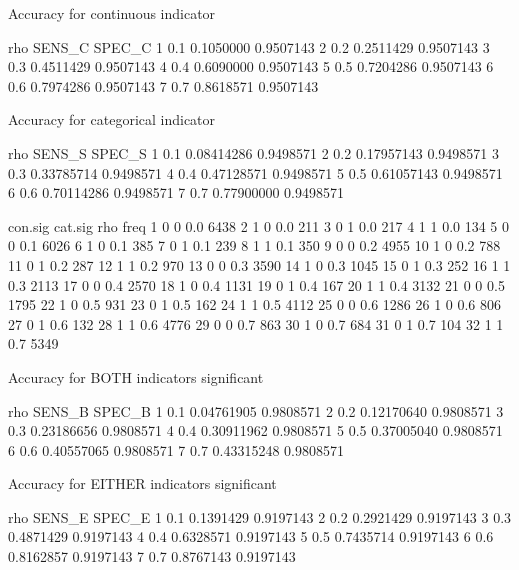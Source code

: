 \documentclass{article}
\begin{document}
\begin{Schunk}
\begin{Soutput}
Accuracy for continuous indicator
\end{Soutput}
\begin{Soutput}
  rho    SENS_C    SPEC_C
1 0.1 0.1050000 0.9507143
2 0.2 0.2511429 0.9507143
3 0.3 0.4511429 0.9507143
4 0.4 0.6090000 0.9507143
5 0.5 0.7204286 0.9507143
6 0.6 0.7974286 0.9507143
7 0.7 0.8618571 0.9507143
\end{Soutput}
\begin{Soutput}
Accuracy for categorical indicator
\end{Soutput}
\begin{Soutput}
  rho     SENS_S    SPEC_S
1 0.1 0.08414286 0.9498571
2 0.2 0.17957143 0.9498571
3 0.3 0.33785714 0.9498571
4 0.4 0.47128571 0.9498571
5 0.5 0.61057143 0.9498571
6 0.6 0.70114286 0.9498571
7 0.7 0.77900000 0.9498571
\end{Soutput}
\begin{Soutput}
   con.sig cat.sig rho freq
1        0       0 0.0 6438
2        1       0 0.0  211
3        0       1 0.0  217
4        1       1 0.0  134
5        0       0 0.1 6026
6        1       0 0.1  385
7        0       1 0.1  239
8        1       1 0.1  350
9        0       0 0.2 4955
10       1       0 0.2  788
11       0       1 0.2  287
12       1       1 0.2  970
13       0       0 0.3 3590
14       1       0 0.3 1045
15       0       1 0.3  252
16       1       1 0.3 2113
17       0       0 0.4 2570
18       1       0 0.4 1131
19       0       1 0.4  167
20       1       1 0.4 3132
21       0       0 0.5 1795
22       1       0 0.5  931
23       0       1 0.5  162
24       1       1 0.5 4112
25       0       0 0.6 1286
26       1       0 0.6  806
27       0       1 0.6  132
28       1       1 0.6 4776
29       0       0 0.7  863
30       1       0 0.7  684
31       0       1 0.7  104
32       1       1 0.7 5349
\end{Soutput}
\begin{Soutput}
Accuracy for BOTH indicators significant
\end{Soutput}
\begin{Soutput}
  rho     SENS_B    SPEC_B
1 0.1 0.04761905 0.9808571
2 0.2 0.12170640 0.9808571
3 0.3 0.23186656 0.9808571
4 0.4 0.30911962 0.9808571
5 0.5 0.37005040 0.9808571
6 0.6 0.40557065 0.9808571
7 0.7 0.43315248 0.9808571
\end{Soutput}
\begin{Soutput}
Accuracy for EITHER indicators significant
\end{Soutput}
\begin{Soutput}
  rho    SENS_E    SPEC_E
1 0.1 0.1391429 0.9197143
2 0.2 0.2921429 0.9197143
3 0.3 0.4871429 0.9197143
4 0.4 0.6328571 0.9197143
5 0.5 0.7435714 0.9197143
6 0.6 0.8162857 0.9197143
7 0.7 0.8767143 0.9197143
\end{Soutput}
\end{Schunk}
\end{document}
